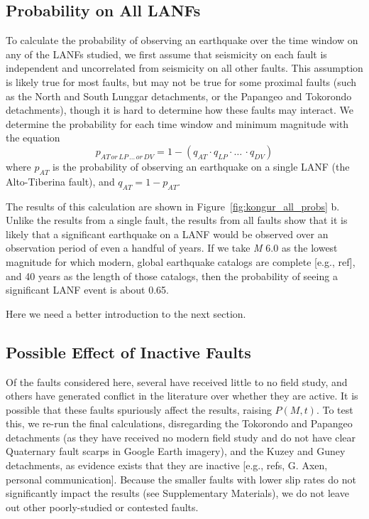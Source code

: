 \documentclass[twocolumn,grl]{AGUTeX}
\begin{document}
\begin{article}
\subsection{Probability on All LANFs}
To calculate the probability of observing an earthquake over the time window on any of the LANFs studied, we first assume that seismicity on each fault is independent and uncorrelated from seismicity on all other faults. This assumption is likely true for most faults, but may not be true for some proximal faults (such as the North and South Lunggar detachments, or the Papangeo and Tokorondo detachments), though it is hard to determine how these faults may interact.  We determine the probability for each time window and minimum magnitude with the equation
\begin{equation}
p_{AT \, or \, LP\, \ldots \, or \, DV} = 1 - (q_{AT} \cdot q_{LP} \cdot \ldots \, \cdot q_{DV})
\end{equation}
where $p_{AT}$ is the probability of observing an earthquake on a single LANF (the Alto-Tiberina fault), and $q_{AT} = 1 - p_{AT}$.

The results of this calculation are shown in Figure~\ref{fig:kongur_all_probs} b.  Unlike the results from a single fault, the results from all faults show that it is likely that a significant earthquake on a LANF would be observed over an observation period of even a handful of years.  If we take \emph{M} 6.0 as the lowest magnitude for which modern, global earthquake catalogs are complete [e.g., ref], and 40 years as the length of those catalogs, then the probability of seeing a significant LANF event is about 0.65.

Here we need a better introduction to the next section.

\subsection{Possible Effect of Inactive Faults}
Of the faults considered here, several have received little to no field study, and others have generated conflict in the literature over whether they are active.  It is possible that these faults spuriously affect the results, raising $P(M,t)$.  To test this, we re-run the final calculations, disregarding the Tokorondo and Papangeo detachments (as they have received no modern field study and do not have clear Quaternary fault scarps in Google Earth imagery), and the Kuzey and Guney detachments, as evidence exists that they are inactive [e.g., refs, G. Axen, personal communication].  Because the smaller faults with lower slip rates do not significantly impact the results (see Supplementary Materials), we do not leave out other poorly-studied or contested faults.
	

\end{article}
\end{document}
